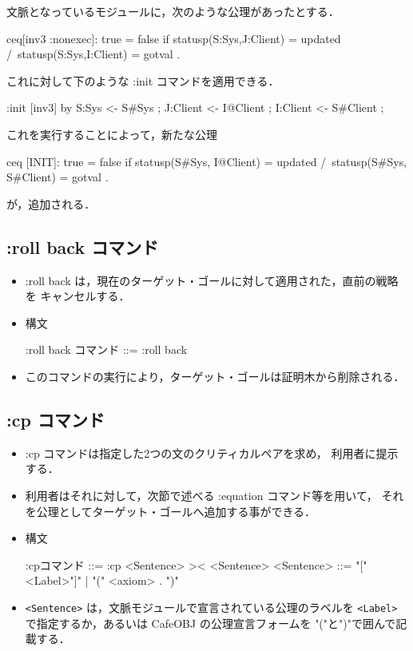 \documentclass[a4paper,oneside,10pt,here]{memoir}
\newenvironment{vvtm}%
{\parskip=0pt\lineskip=0pt\begin{center}\begin{minipage}{0.8\textwidth}\begin{snugshade}}%
  {\end{snugshade}\end{minipage}\end{center}}
\begin{document}
文脈となっているモジュールに，次のような公理があったとする．
\begin{examplev}
ceq[inv3 :nonexec]: true = false if statusp(S:Sys,J:Client) = updated /\ 
                                              statusp(S:Sys,I:Client) = gotval .
\end{examplev}
これに対して下のような :init コマンドを適用できる．
\begin{examplev}
  :init [inv3] by {S:Sys <- S#Sys ; J:Client <- I@Client ; I:Client <- S#Client ;}
\end{examplev}
これを実行することによって，新たな公理
\begin{examplev}
ceq [INIT]: true = false if statusp(S#Sys, I@Client) = updated /\
                                  statusp(S#Sys, S#Client) = gotval .
\end{examplev}
が，追加される．

\subsection{:roll back コマンド}

\begin{itemize}
\item :roll back は，現在のターゲット・ゴールに対して適用された，直前の戦略を
  キャンセルする．
\item 構文
  \begin{vvtm}
    \begin{simplev}
      :roll back コマンド ::= :roll back
    \end{simplev}
  \end{vvtm}
\item このコマンドの実行により，ターゲット・ゴールは証明木から削除される．
\end{itemize}

\subsection{:cp コマンド}

\begin{itemize}
\item :cp コマンドは指定した2つの文のクリティカルペアを求め，
  利用者に提示する．
\item 利用者はそれに対して，次節で述べる :equation コマンド等を用いて，
  それを公理としてターゲット・ゴールへ追加する事ができる．
\item 構文
  \begin{vvtm}
    \begin{simplev}
      :cpコマンド ::= :cp <Sentence> >< <Sentence>
      <Sentence>  ::= "["<Label>"]" | "(" <axiom> . ")"
    \end{simplev}
  \end{vvtm}
\item \verb|<Sentence>| は，文脈モジュールで宣言されている公理のラベルを
  \verb|<Label>| で指定するか，あるいは CafeOBJ の公理宣言フォームを
  "("と")"で囲んで記載する．
\end{itemize}
\end{document}
